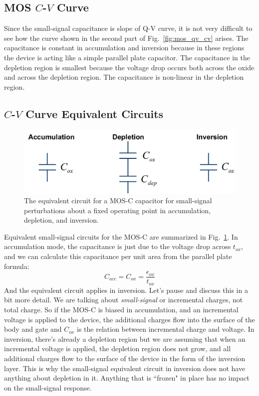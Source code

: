 \subsection{MOS \texorpdfstring{$C$-$V$}{C-V} Curve}
Since the small-signal capacitance is slope of Q-V curve, it is not very difficult to see how the curve shown in the second part of Fig.~\ref{fig:mos_qv_cv} arises.  The capacitance is constant in accumulation and inversion because in these regions the device is acting like a simple parallel plate capacitor.  The capacitance in the depletion region is smallest because the voltage drop occurs both across the oxide and across the depletion region.  The capacitance is non-linear in the depletion region.  
\subsection{\texorpdfstring{$C$-$V$}{C-V} Curve Equivalent Circuits}
\begin{figure}[tbh]
\centering
\includegraphics[width=.85\columnwidth]{mos_cv_circuits}
\caption{The equivalent circuit for a MOS-C capacitor for small-signal perturbations about a fixed operating point in accumulation, depletion, and inversion.}
\label{fig:mos_cv_circuits}
\end{figure}
Equivalent small-signal circuits for the MOS-C are summarized in Fig.~\ref{fig:mos_cv_circuits}.   In accumulation mode, the capacitance is just due to the voltage drop across $t_{ox}$, and we can calculate this capacitance per unit area from the parallel plate formula:
    \begin{equation}
        C_{acc} = C_{ox} = \frac{\epsilon_{ox}}{t_{ox}}
    \end{equation}
And the equivalent circuit applies in inversion.  Let's pause and discuss this in a bit more detail.  We are talking about \emph{small-signal} or incremental charges, not total charge.   So if the MOS-C is biased in accumulation, and an incremental voltage is applied to the device, the additional charges flow into the surface of the body and gate and $C_{ox}$ is the relation between incremental charge and voltage.  In inversion, there's already a depletion region but we are assuming that when an incremental voltage is applied, the depletion region does not grow, and all additional charges flow to the surface of the device in the form of the inversion layer. This is why the small-signal equivalent circuit in inversion does not have anything about depletion in it.  Anything that is ``frozen" in place has no impact on the small-signal response.
